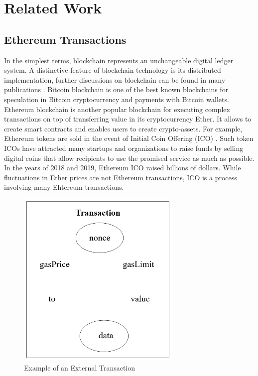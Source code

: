 %
\chapter{Related Work}
\label{sec:review}



\section{Ethereum Transactions}
\label{sec:review:transactions}

In the simplest terms, blockchain represents an unchangeable digital ledger system. A distinctive feature of blockchain technology is its distributed implementation, further discussions on blockchain can be found in many publications \cite{9}. Bitcoin blockchain is one of the best known blockchains for speculation in Bitcoin cryptocurrency and payments with Bitcoin wallets. Ethereum blockchain is another popular blockchain for executing complex transactions on top of transferring value in its cryptocurrency Ether. It allows to create smart contracts and enables users to create crypto-assets. For example, Ethereum tokens are sold in the event of Initial Coin Offering (ICO) \cite{10}. Such token ICOs have attracted many startups and organizations to raise funds by selling digital coins that allow recipients to use the promised service as much as possible. In the years of 2018 and 2019, Ethereum ICO raised billions of dollars. While fluctuations in Ether prices are not Ethereum transactions, ICO is a process involving many Ehtereum transactions.

\begin{figure}[htb]
	\includegraphics[width=0.7\textwidth]{gfx/transactions.png}
	\caption{Example of an External Transaction}
	\label{fig:transactions}
\end{figure}

